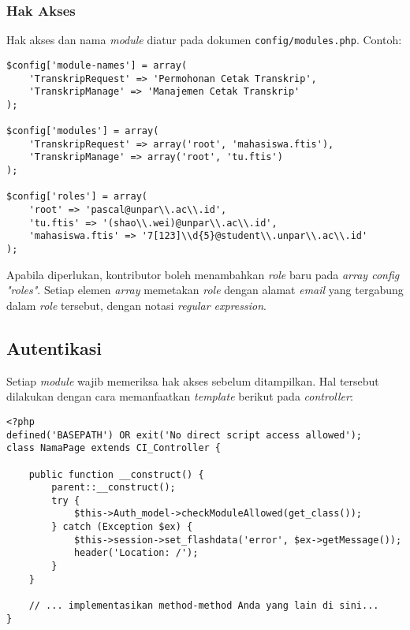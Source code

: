 	\subsubsection{Hak Akses}
		Hak akses dan nama \textit{module} diatur pada dokumen \texttt{config/modules.php}. Contoh:
\begin{lstlisting}
$config['module-names'] = array(
    'TranskripRequest' => 'Permohonan Cetak Transkrip',
    'TranskripManage' => 'Manajemen Cetak Transkrip'
);

$config['modules'] = array(
    'TranskripRequest' => array('root', 'mahasiswa.ftis'),
    'TranskripManage' => array('root', 'tu.ftis')
);

$config['roles'] = array(
    'root' => 'pascal@unpar\\.ac\\.id',
    'tu.ftis' => '(shao\\.wei)@unpar\\.ac\\.id',
    'mahasiswa.ftis' => '7[123]\\d{5}@student\\.unpar\\.ac\\.id'
);
\end{lstlisting}
	
		Apabila diperlukan, kontributor boleh menambahkan \textit{role} baru pada \textit{array config "roles"}. Setiap elemen \textit{array} memetakan \textit{role} dengan alamat \textit{email} yang tergabung dalam \textit{role} tersebut, dengan notasi \textit{regular expression}.

\subsection{Autentikasi}
	Setiap \textit{module} wajib memeriksa hak akses sebelum ditampilkan. Hal tersebut dilakukan dengan cara memanfaatkan \textit{template} berikut pada \textit{controller}:
\begin{lstlisting}
<?php
defined('BASEPATH') OR exit('No direct script access allowed');
class NamaPage extends CI_Controller {

    public function __construct() {
        parent::__construct();
        try {
            $this->Auth_model->checkModuleAllowed(get_class());
        } catch (Exception $ex) {
            $this->session->set_flashdata('error', $ex->getMessage());
            header('Location: /');
        }
    }

    // ... implementasikan method-method Anda yang lain di sini...
}
\end{lstlisting}

